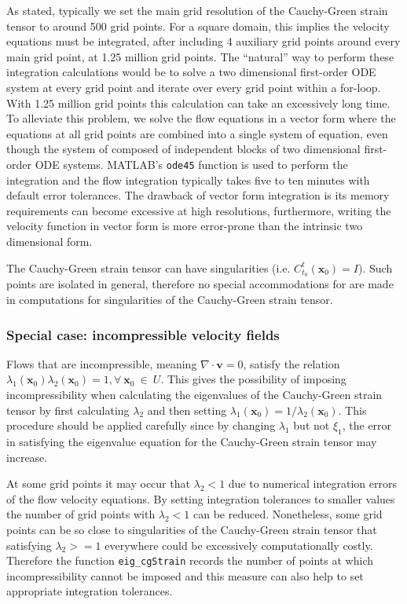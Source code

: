 \documentclass{article}
\begin{document}
As stated, typically we set the main grid resolution of the Cauchy-Green strain tensor to around 500 grid points. For a square domain, this implies the velocity equations must be integrated, after including 4 auxiliary grid points around every main grid point, at 1.25 million grid points. The ``natural'' way to perform these integration calculations would be to solve a two dimensional first-order ODE system at every grid point and iterate over every grid point within a for-loop. With 1.25 million grid points this calculation can take an excessively long time. To alleviate this problem, we solve the flow equations in a vector form where the equations at all grid points are combined into a single system of equation, even though the system of composed of independent blocks of two dimensional first-order ODE systems. MATLAB's \texttt{ode45} function is used to perform the integration and the flow integration typically takes five to ten minutes with default error tolerances. The drawback of vector form integration is its memory requirements can become excessive at high resolutions, furthermore, writing the velocity function in vector form is more error-prone than the intrinsic two dimensional form.

The Cauchy-Green strain tensor can have singularities (i.e. $C_{t_0}^t(\boldsymbol x_0) = I$). Such points are isolated in general\parencite{delmarcelle94}, therefore no special accommodations for are made in computations for singularities of the Cauchy-Green strain tensor.

\subsubsection{Special case: incompressible velocity fields}

Flows that are incompressible, meaning $\nabla \cdot \boldsymbol v = 0$, satisfy the relation $\lambda_1(\boldsymbol x_0) \lambda_2(\boldsymbol x_0) = 1, \forall \: \boldsymbol x_0 \: \in \: U$\parencite{arnold78:_mathem}. This gives the possibility of imposing incompressibility when calculating the eigenvalues of the Cauchy-Green strain tensor by first calculating $\lambda_2$ and then setting $\lambda_1(\boldsymbol x_0) = 1/\lambda_2(\boldsymbol x_0)$. This procedure should be applied carefully since by changing $\lambda_1$ but not $\xi_1$, the error in satisfying the eigenvalue equation for the Cauchy-Green strain tensor may increase.

At some grid points it may occur that $\lambda_2 < 1$ due to numerical integration errors of the flow velocity equations. By setting integration tolerances to smaller values the number of grid points with $\lambda_2 < 1$ can be reduced. Nonetheless, some grid points can be so close to singularities of the Cauchy-Green strain tensor that satisfying $\lambda_2 >= 1$ everywhere could be excessively computationally costly. Therefore the function \texttt{eig\_cgStrain} records the number of points at which incompressibility cannot be imposed and this measure can also help to set appropriate integration tolerances.
\end{document}
